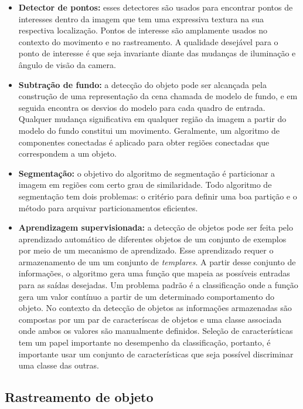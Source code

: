 	\begin{itemize}
		\item \textbf{Detector de pontos:} esses detectores são usados para encontrar pontos de interesses dentro da imagem que tem uma expressiva textura na sua respectiva localização. Pontos de interesse são amplamente usados no contexto do movimento e no rastreamento. A qualidade desejável para o ponto de interesse é que seja invariante diante das mudanças de iluminação e ângulo de visão da camera.
	
		\item \textbf{Subtração de fundo:} a detecção do objeto pode ser alcançada pela construção de uma representação da cena chamada de modelo de fundo, e em seguida encontra os desvios do modelo para cada quadro de entrada. Qualquer mudança significativa em qualquer região da imagem a partir do modelo do fundo constitui um movimento. Geralmente, um algoritmo de componentes conectadas é aplicado para obter regiões conectadas que correspondem a um objeto.

		\item \textbf{Segmentação:} o objetivo do algoritmo de segmentação é particionar a imagem em regiões com certo grau de similaridade. Todo algoritmo de segmentação tem dois problemas: o critério para definir uma boa partição e o método para arquivar particionamentos eficientes.

		\item \textbf{Aprendizagem supervisionada:} a detecção de objetos pode ser feita pelo aprendizado automático de diferentes objetos de um conjunto de exemplos por meio de um mecanismo de aprendizado. Esse aprendizado requer o armazenamento de um um conjunto de \textit{templares}. A partir desse conjunto de informações, o algoritmo gera uma função que mapeia as possíveis entradas para as saídas desejadas. Um problema padrão é a classificação onde a função gera um valor contínuo a partir de um determinado comportamento do objeto. No contexto da detecção de objetos as informações armazenadas são compostas por um par de caracteríscas de objetos e uma classe associada onde ambos os valores são manualmente definidos. Seleção de características tem um papel importante no desempenho da classificação, portanto, é importante usar um conjunto de características que seja possível discriminar uma classe das outras.
	\end{itemize}

\subsection{Rastreamento de objeto}

